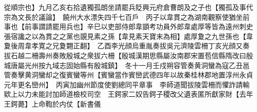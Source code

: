 從順宗也】九月乙亥右拾遺獨孤朗坐請罷兵貶興元府倉曹朗及之子也【獨孤及事代宗為文長於議論】　饒州大水漂失四千七百戶　丙子以韋貫之為湖南觀察使猶坐前事也【前事謂請罷用兵也】辛巳以吏部侍郎韋顗考功員外郎韋處厚等皆為遠州刺史張宿讒之以為貫之之黨也覬見素之孫【韋見素天寶末為相】處厚夐之九世孫也【韋夐後周韋孝寛之兄夐翾正翻】　乙酉李光顔烏重胤奏拔吳元濟陵雲柵丁亥光顔又奏拔石越二柵壽州奏敗殷城之衆拔六柵【殷城漢期思縣屬汝南郡宋置苞信縣隋改曰殷城唐屬光州按九域志固始縣有殷城鎮】　冬十一月壬戍朔容管奏黄洞蠻為寇乙丑邕管奏擊黄洞蠻却之復賓蠻等州【賓蠻當作賓巒武德四年以故秦桂林郡地置淳州永貞元年更名巒州】　丙寅加幽州節度使劉總同平章事　李師道聞拔陵雲柵而懼詐請輸欵上以力未能討加師道檢校司空　王鍔家二奴告鍔子稷改父遺表匿所獻家財【去年王鍔薨】上命鞫於内仗【新書儀